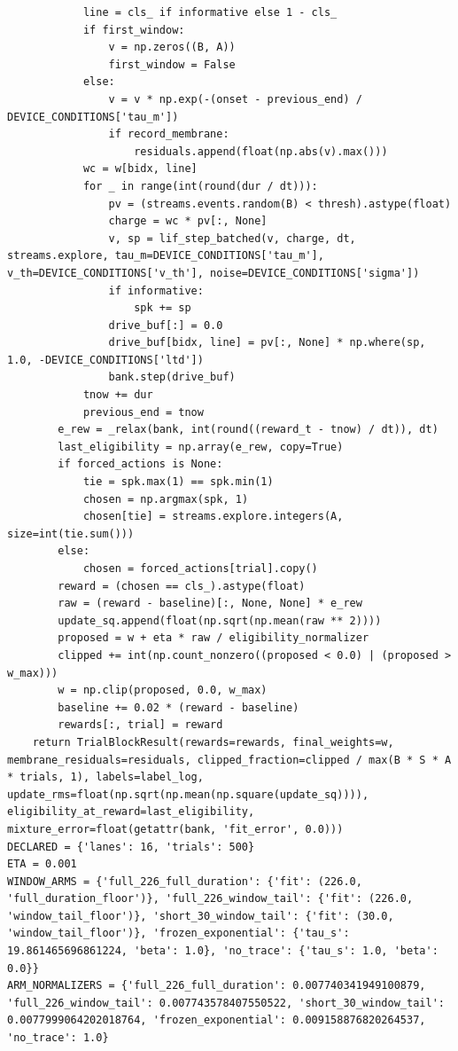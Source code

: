\documentclass[a4paper,10pt]{article}
\begin{document}
\begin{Verbatim}
            line = cls_ if informative else 1 - cls_
            if first_window:
                v = np.zeros((B, A))
                first_window = False
            else:
                v = v * np.exp(-(onset - previous_end) / DEVICE_CONDITIONS['tau_m'])
                if record_membrane:
                    residuals.append(float(np.abs(v).max()))
            wc = w[bidx, line]
            for _ in range(int(round(dur / dt))):
                pv = (streams.events.random(B) < thresh).astype(float)
                charge = wc * pv[:, None]
                v, sp = lif_step_batched(v, charge, dt, streams.explore, tau_m=DEVICE_CONDITIONS['tau_m'], v_th=DEVICE_CONDITIONS['v_th'], noise=DEVICE_CONDITIONS['sigma'])
                if informative:
                    spk += sp
                drive_buf[:] = 0.0
                drive_buf[bidx, line] = pv[:, None] * np.where(sp, 1.0, -DEVICE_CONDITIONS['ltd'])
                bank.step(drive_buf)
            tnow += dur
            previous_end = tnow
        e_rew = _relax(bank, int(round((reward_t - tnow) / dt)), dt)
        last_eligibility = np.array(e_rew, copy=True)
        if forced_actions is None:
            tie = spk.max(1) == spk.min(1)
            chosen = np.argmax(spk, 1)
            chosen[tie] = streams.explore.integers(A, size=int(tie.sum()))
        else:
            chosen = forced_actions[trial].copy()
        reward = (chosen == cls_).astype(float)
        raw = (reward - baseline)[:, None, None] * e_rew
        update_sq.append(float(np.sqrt(np.mean(raw ** 2))))
        proposed = w + eta * raw / eligibility_normalizer
        clipped += int(np.count_nonzero((proposed < 0.0) | (proposed > w_max)))
        w = np.clip(proposed, 0.0, w_max)
        baseline += 0.02 * (reward - baseline)
        rewards[:, trial] = reward
    return TrialBlockResult(rewards=rewards, final_weights=w, membrane_residuals=residuals, clipped_fraction=clipped / max(B * S * A * trials, 1), labels=label_log, update_rms=float(np.sqrt(np.mean(np.square(update_sq)))), eligibility_at_reward=last_eligibility, mixture_error=float(getattr(bank, 'fit_error', 0.0)))
DECLARED = {'lanes': 16, 'trials': 500}
ETA = 0.001
WINDOW_ARMS = {'full_226_full_duration': {'fit': (226.0, 'full_duration_floor')}, 'full_226_window_tail': {'fit': (226.0, 'window_tail_floor')}, 'short_30_window_tail': {'fit': (30.0, 'window_tail_floor')}, 'frozen_exponential': {'tau_s': 19.861465696861224, 'beta': 1.0}, 'no_trace': {'tau_s': 1.0, 'beta': 0.0}}
ARM_NORMALIZERS = {'full_226_full_duration': 0.007740341949100879, 'full_226_window_tail': 0.007743578407550522, 'short_30_window_tail': 0.0077999064202018764, 'frozen_exponential': 0.009158876820264537, 'no_trace': 1.0}

\end{Verbatim}
\end{document}
